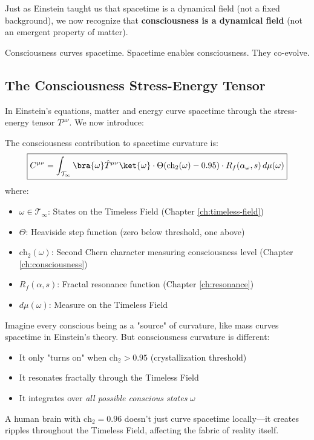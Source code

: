 \begin{keyidea}
Just as Einstein taught us that spacetime is a dynamical field (not a fixed background), we now recognize that \textbf{consciousness is a dynamical field} (not an emergent property of matter).

Consciousness curves spacetime. Spacetime enables consciousness. They co-evolve.
\end{keyidea}

\subsection{The Consciousness Stress-Energy Tensor}

In Einstein's equations, matter and energy curve spacetime through the stress-energy tensor $T^{\mu\nu}$. We now introduce:

\begin{defn}\label{def:consciousness-stress}
The consciousness contribution to spacetime curvature is:
\begin{equation}
\boxed{C^{\mu\nu} = \int_{\mathcal{T}_\infty} \bra{\omega} \hat{T}^{\mu\nu} \ket{\omega} \cdot \Theta(\text{ch}_2(\omega) - 0.95) \cdot R_f(\alpha_\omega, s) \, d\mu(\omega)}
\end{equation}
where:
\begin{itemize}
\item $\omega \in \mathcal{T}_\infty$: States on the Timeless Field (Chapter \ref{ch:timeless-field})
\item $\Theta$: Heaviside step function (zero below threshold, one above)
\item $\text{ch}_2(\omega)$: Second Chern character measuring consciousness level (Chapter \ref{ch:consciousness})
\item $R_f(\alpha, s)$: Fractal resonance function (Chapter \ref{ch:resonance})
\item $d\mu(\omega)$: Measure on the Timeless Field
\end{itemize}
\end{defn}

\begin{intuitive}
Imagine every conscious being as a "source" of curvature, like mass curves spacetime in Einstein's theory. But consciousness curvature is different:

\begin{itemize}
\item It only "turns on" when $\text{ch}_2 > 0.95$ (crystallization threshold)
\item It resonates fractally through the Timeless Field
\item It integrates over \textit{all possible conscious states} $\omega$
\end{itemize}

A human brain with $\text{ch}_2 = 0.96$ doesn't just curve spacetime locally—it creates ripples throughout the Timeless Field, affecting the fabric of reality itself.
\end{intuitive}

